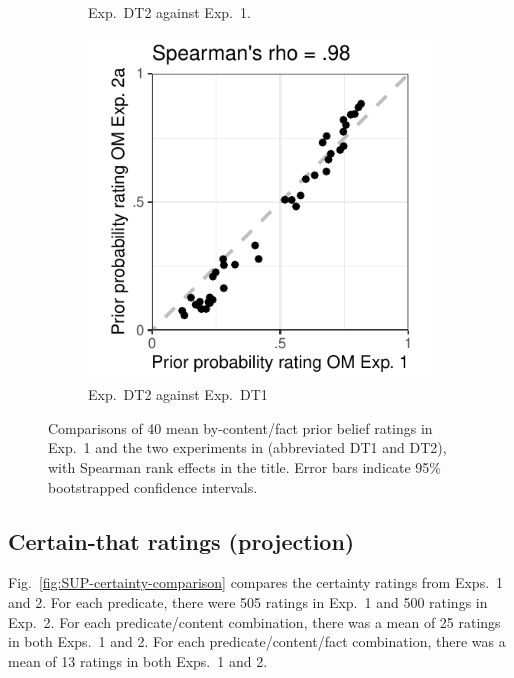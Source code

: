 \documentclass[11pt,fleqn]{article}
\newcommand{\6}{\mbox{$[\hspace*{-.6mm}[$}}
\newcommand{\9}{\mbox{$]\hspace*{-.6mm}]$}}
\begin{document}
\begin{figure}[h!]
\begin{subfigure}[t]{.3\textwidth}
\caption{Exp.~DT2 against Exp.~1.}\label{fig:prior-exp1-expDT2a}
 \end{subfigure} \hfill \begin{subfigure}[t]{.3\textwidth}
\centering
\includegraphics[width=\textwidth]{../../results/exp1/graphs/SUP-priorOMExp1-by-priorOMExp2a}
\caption{Exp.~DT2 against Exp.~DT1}\label{fig:prior-expDT1-expDT2a}
 \end{subfigure}
\caption{Comparisons of 40 mean by-content/fact prior belief ratings in Exp.~1 and the two experiments in \citealt{degen-tonhauser-openmind} (abbreviated DT1 and DT2), with Spearman rank effects in the title. Error bars indicate 95\% bootstrapped confidence intervals.}\label{fig:SUP-prior-comparison}
\end{figure}

\subsection{Certain-that ratings (projection)}

Fig.~\ref{fig:SUP-certainty-comparison} compares the certainty ratings from Exps.~1 and 2. For each predicate, there were 505 ratings in Exp.~1 and 500 ratings in Exp.~2. For each predicate/content combination, there was a mean of 25 ratings in both Exps.~1 and 2. For each predicate/content/fact combination, there was a mean of 13 ratings in both Exps.~1 and 2.
\end{document}
